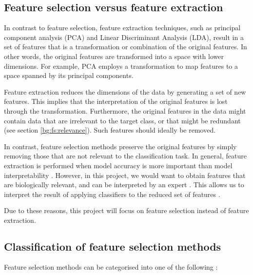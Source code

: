 \documentclass[12pt, twoside, a4paper]{report}
\begin{document}
\subsection{Feature selection versus feature extraction} \label{bg:fs:extraction}

In contrast to feature selection, feature extraction techniques, such as principal component analysis (PCA) and Linear Discriminant Analysis (LDA), result in a set of features that is a transformation or combination of the original features. In other words, the original features are transformed into a space with lower dimensions. For example, PCA employs a transformation to map features to a space spanned by its principal components.

Feature extraction reduces the dimensions of the data by generating a set of new features. This implies that the interpretation of the original features is lost through the transformation. Furthermore, the original features in the data might contain data that are irrelevant to the target class, or that might be redundant (see section \ref{bg:fs:relevance}). Such features should ideally be removed.

In contrast, feature selection methods preserve the original features by simply removing those that are not relevant to the classification task. In general, feature extraction is performed when model accuracy is more important than model interpretability \cite{RefWorks:163}. However, in this project, we would want to obtain features that are biologically relevant, and can be interpreted by an expert \cite{RefWorks:192}. This allows us to interpret the result of applying classifiers to the reduced set of features \cite{RefWorks:142}.

Due to these reasons, this project will focus on feature selection instead of feature extraction.

\subsection{Classification of feature selection methods} \label{bg:fs:classification}

Feature selection methods can be categorised into one of the following \cite{RefWorks:117, RefWorks:118}:
\end{document}
